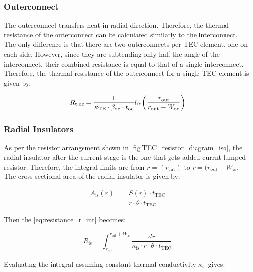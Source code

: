 \documentclass[10pt,a4paper,twocolumn]{article}
\begin{document}
\subsubsection{Outerconnect}

The outerconnect transfers heat in radial direction. Therefore, the thermal resistance of the outerconnect can be calculated similarly to the interconnect. The only difference is that there are two outerconnects per TEC element, one on each side. However, since they are subtending only half the angle of the interconnect, their combined resistance is equal to that of a single interconnect. Therefore, the thermal resistance of the outerconnect for a single TEC element is given by:


\begin{equation}
	R_{\text{t,oc}} = \frac{1}{\kappa_{\text{TE}} \cdot \beta_{\text{oc}} \cdot t_{\text{oc}}} \\ln\left( \frac{r_{\text{out}}}{r_{\text{out}} - W_{\text{oc}}} \right)
\end{equation}

\subsubsection{Radial Insulators}

As per the resistor arrangement shown in \cref{fig:TEC_resistor_diagram_iso}, the radial insulator after the current stage is the one that gets added currnt lumped resistor. Therefore, the integral limits are from $r=(r_{\text{out}})$ to $r=(r_{\text{out}}+W_{\text{is}}$. The cross sectional area of the radial insulator is given by:

\begin{equation*}
	\begin{aligned}
		A_{\text{is}}(r) & = S(r)\cdot t_{\text{TEC}}            \\
		                 & = r \cdot \theta \cdot t_{\text{TEC}}
	\end{aligned}
\end{equation*}

Then the \cref{eq:resistance_r_int} becomes:

\begin{equation*}
	R_{\text{is}} = \int_{r_{\text{out}}}^{r_{\text{out}}+W_{\text{is}}} \frac{dr}{\kappa_{\text{is}} \cdot r \cdot \theta \cdot t_{\text{TEC}}}
\end{equation*}

Evaluating the integral assuming constant thermal conductivity $\kappa_{\text{is}}$ gives:
\end{document}
